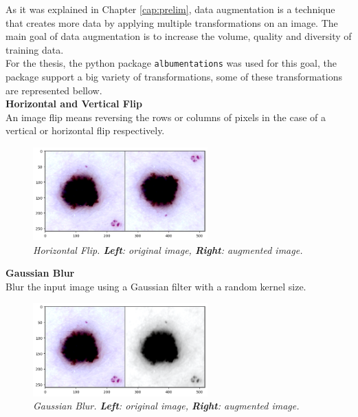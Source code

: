As it was explained in Chapter \ref{cap:prelim}, data augmentation is
a technique that creates more data by applying multiple transformations on an
image. The  main goal of data augmentation is to increase the volume, quality
and diversity of training data. \\

For the thesis, the python package {\tt albumentations} was used for this goal,
the package support a big variety of transformations, some of these
transformations are represented bellow. \\

\textbf{Horizontal and Vertical Flip} \\

An image flip means reversing the rows or columns of pixels in the case of a vertical or horizontal flip respectively.

\begin{figure}[H]
  \centering
  \includegraphics[width=0.6\textwidth]{imatges/methodological_contribution/horizontal-flip.png}
  \caption[Horizontal Flip]{\textit{Horizontal Flip. \textbf{Left}: original image, \textbf{Right}: augmented image. }}
\end{figure}

\vspace{0.5cm}
\textbf{Gaussian Blur} \\

Blur the input image using a Gaussian filter with a random kernel size.

\begin{figure}[H]
  \centering
  \includegraphics[width=0.6\textwidth]{imatges/methodological_contribution/gaussianblur.png}
  \caption[Gaussian Blur]{\textit{Gaussian Blur. \textbf{Left}: original image, \textbf{Right}: augmented image. }}
\end{figure}

